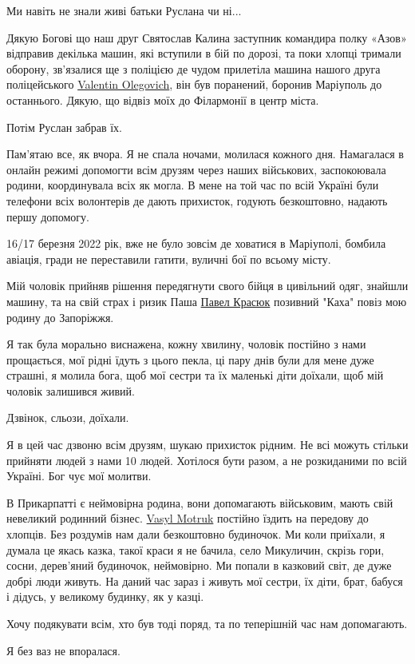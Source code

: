 Ми навіть не знали живі батьки Руслана чи ні...

Дякую Богові що наш друг Святослав Калина заступник командира полку «Азов»
відправив декілька машин, які вступили в бій по дорозі, та поки хлопці тримали
оборону, зв'язалися ще з поліцією де чудом прилетіла машина нашого друга
поліцейського \href{https://www.facebook.com/valek.evteev}{Valentin Olegovich}, він був поранений, боронив Маріуполь до
останнього. Дякую, що відвіз моїх до Філармонії в центр міста.

Потім Руслан забрав їх.  

Пам'ятаю все, як вчора. Я не спала ночами, молилася кожного дня. Намагалася в
онлайн режимі допомогти всім друзям через наших військових, заспокоювала
родини, координувала всіх як могла. В мене на той час по всій Україні були
телефони всіх волонтерів де дають прихисток, годують  безкоштовно, надають
першу допомогу.

16/17 березня 2022 рік, вже не було зовсім де ховатися в Маріуполі, бомбила
авіація, гради не переставили гатити, вуличні бої по всьому місту. 

Мій чоловік прийняв рішення передягнути свого бійця в цивільний одяг, знайшли
машину, та на свій страх і ризик Паша \href{https://www.facebook.com/profile.php?id=100024234921161}{Павел Красюк} позивний "Каха" повіз мою
родину до Запоріжжя. 

Я так була морально виснажена, кожну хвилину, чоловік постійно з нами
прощається, мої рідні їдуть з цього пекла, ці пару днів були для мене дуже
страшні, я молила бога, щоб мої сестри та їх маленькі діти доїхали, щоб мій
чоловік залишився живий.

Дзвінок, сльози, доїхали.

Я в цей час дзвоню всім друзям, шукаю прихисток рідним. Не всі можуть стільки
прийняти людей з нами 10 людей. Хотілося бути разом, а не розкиданими по всій
Україні. Бог чує мої молитви.🙏

В Прикарпатті є неймовірна родина, вони допомагають військовим, мають свій
невеликий родинний бізнес. \href{https://www.facebook.com/vasyl.motruk}{Vasyl
Motruk} постійно їздить на передову до хлопців.  Без роздумів нам дали
безкоштовно будиночок. Ми коли приїхали, я думала це якась казка, такої краси я
не бачила, село Микуличин, скрізь гори, сосни, дерев'яний будиночок,
неймовірно. Ми попали в казковий світ, де дуже добрі люди живуть. На даний час
зараз і живуть мої сестри, їх діти, брат, бабуся і дідусь, у великому будинку,
як у казці. 

Хочу подякувати всім, хто був тоді поряд, та по теперішній час нам допомагають. 

Я без ваз не впоралася.💛💙

